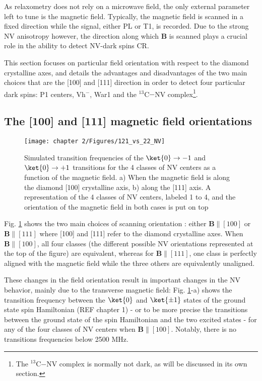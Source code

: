 \documentclass[a4paper, 11pt]{report}
\begin{document}
As relaxometry does not rely on a microwave field, the only external parameter left to tune is the magnetic field. Typically, the magnetic field is scanned in a fixed direction while the signal, either PL or T1, is recorded. Due to the strong NV anisotropy however, the direction along which $\mathbf{B}$ is scanned plays a crucial role in the ability to detect NV-dark spins CR.

This section focuses on particular field orientation with respect to the diamond crystalline axes, and details the advantages and disadvantages of the two main choices that are the [100] and [111] direction in order to detect four particular dark spins: P1 centers, Vh$^-$, War1 and the $^{13}$C$-$NV complex\footnote{The $^{13}$C$-$NV complex is normally not dark, as will be discussed in its own section.}.

\subsection{The [100] and [111] magnetic field orientations}
\label{sec simu}

\begin{figure}[h]
\centering
\texttt{[image: chapter 2/Figures/121\_vs\_22\_NV]}
\caption{Simulated transition frequencies of the $\ket{0} \to {-1}$ and $\ket{0} \to {+1}$ transitions for the 4 classes of NV centers as a function of the magnetic field. a) When the magnetic field is along the diamond [100] crystalline axis, b) along the [111] axis. A representation of the 4 classes of NV centers, labeled 1 to 4, and the orientation of the magnetic field in both cases is put on top}
\label{121 vs 22 NV}
\end{figure}

Fig. \ref{121 vs 22 NV} shows the two main choices of scanning orientation : either $\mathbf{B} \parallel [100]$ or 
$\mathbf{B} \parallel [111]$ where [100] and [111] refer to the diamond crystalline axes. When $\mathbf{B} \parallel [100]$, all four classes (the different possible NV orientations represented at the top of the figure) are equivalent, whereas for $\mathbf{B} \parallel [111]$, one class is perfectly aligned with the magnetic field while the three others are equivalently unaligned. 

These changes in the field orientation result in important changes in the NV behavior, mainly due to the transverse magnetic field: Fig. \ref{121 vs 22 NV}-a) shows the transition frequency between the $\ket{0}$ and $\ket{\pm 1}$ states of the ground state spin Hamiltonian (REF chapter 1) - or to be more precise the transitions between the ground state of the spin Hamiltonian and the two excited states - for any of the four classes of NV centers when $\mathbf{B} \parallel [100]$. Notably, there is no transitions frequencies below 2500 MHz. 
\end{document}
